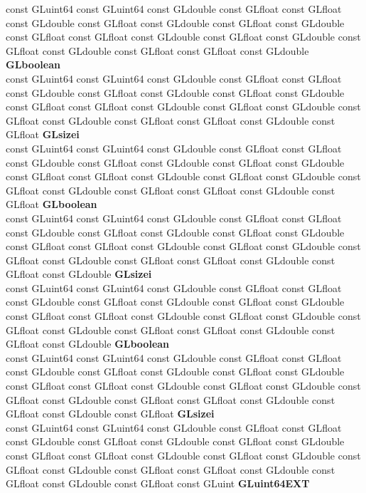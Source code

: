 \begin{DoxyCompactItemize}
\begin{tabbing}
\>const GLuint64 const GLuint64 const GLdouble const GLfloat const GLfloat const GLdouble const GLfloat const GLdouble const GLfloat const GLdouble const GLfloat const GLfloat const GLdouble const GLfloat const GLdouble const GLfloat const GLdouble const GLfloat const GLfloat const GLdouble {\bfseries GLboolean}\\
\>const GLuint64 const GLuint64 const GLdouble const GLfloat const GLfloat const GLdouble const GLfloat const GLdouble const GLfloat const GLdouble const GLfloat const GLfloat const GLdouble const GLfloat const GLdouble const GLfloat const GLdouble const GLfloat const GLfloat const GLdouble const GLfloat {\bfseries GLsizei}\\
\>const GLuint64 const GLuint64 const GLdouble const GLfloat const GLfloat const GLdouble const GLfloat const GLdouble const GLfloat const GLdouble const GLfloat const GLfloat const GLdouble const GLfloat const GLdouble const GLfloat const GLdouble const GLfloat const GLfloat const GLdouble const GLfloat {\bfseries GLboolean}\\
\>const GLuint64 const GLuint64 const GLdouble const GLfloat const GLfloat const GLdouble const GLfloat const GLdouble const GLfloat const GLdouble const GLfloat const GLfloat const GLdouble const GLfloat const GLdouble const GLfloat const GLdouble const GLfloat const GLfloat const GLdouble const GLfloat const GLdouble {\bfseries GLsizei}\\
\>const GLuint64 const GLuint64 const GLdouble const GLfloat const GLfloat const GLdouble const GLfloat const GLdouble const GLfloat const GLdouble const GLfloat const GLfloat const GLdouble const GLfloat const GLdouble const GLfloat const GLdouble const GLfloat const GLfloat const GLdouble const GLfloat const GLdouble {\bfseries GLboolean}\\
\>const GLuint64 const GLuint64 const GLdouble const GLfloat const GLfloat const GLdouble const GLfloat const GLdouble const GLfloat const GLdouble const GLfloat const GLfloat const GLdouble const GLfloat const GLdouble const GLfloat const GLdouble const GLfloat const GLfloat const GLdouble const GLfloat const GLdouble const GLfloat {\bfseries GLsizei}\\
\>const GLuint64 const GLuint64 const GLdouble const GLfloat const GLfloat const GLdouble const GLfloat const GLdouble const GLfloat const GLdouble const GLfloat const GLfloat const GLdouble const GLfloat const GLdouble const GLfloat const GLdouble const GLfloat const GLfloat const GLdouble const GLfloat const GLdouble const GLfloat const GLuint {\bfseries GLuint64EXT}\\

\end{tabbing}
\end{DoxyCompactItemize}
